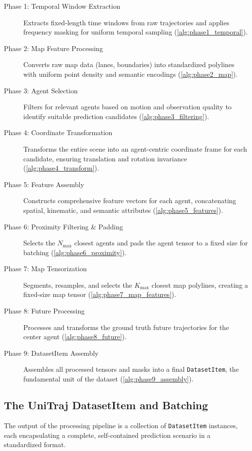 \begin{description}
    \item[Phase 1: Temporal Window Extraction] Extracts fixed-length time windows from raw trajectories and applies frequency masking for uniform temporal sampling (\autoref{alg:phase1_temporal}).
    \item[Phase 2: Map Feature Processing] Converts raw map data (lanes, boundaries) into standardized polylines with uniform point density and semantic encodings (\autoref{alg:phase2_map}).
    \item[Phase 3: Agent Selection] Filters for relevant agents based on motion and observation quality to identify suitable prediction candidates (\autoref{alg:phase3_filtering}).
    \item[Phase 4: Coordinate Transformation] Transforms the entire scene into an agent-centric coordinate frame for each candidate, ensuring translation and rotation invariance (\autoref{alg:phase4_transform}).
    \item[Phase 5: Feature Assembly] Constructs comprehensive feature vectors for each agent, concatenating spatial, kinematic, and semantic attributes (\autoref{alg:phase5_features}).
    \item[Phase 6: Proximity Filtering \& Padding] Selects the \(N_{\max}\) closest agents and pads the agent tensor to a fixed size for batching (\autoref{alg:phase6_proximity}).
    \item[Phase 7: Map Tensorization] Segments, resamples, and selects the \(K_{\max}\) closest map polylines, creating a fixed-size map tensor (\autoref{alg:phase7_map_features}).
    \item[Phase 8: Future Processing] Processes and transforms the ground truth future trajectories for the center agent (\autoref{alg:phase8_future}).
    \item[Phase 9: DatasetItem Assembly] Assembles all processed tensors and masks into a final \texttt{DatasetItem}, the fundamental unit of the dataset (\autoref{alg:phase9_assembly}).
\end{description}

\subsection{The UniTraj DatasetItem and Batching}
\label{ssec:unitraj_dataset}

The output of the processing pipeline is a collection of \texttt{DatasetItem} instances, each encapsulating a complete, self-contained prediction scenario in a standardized format.

